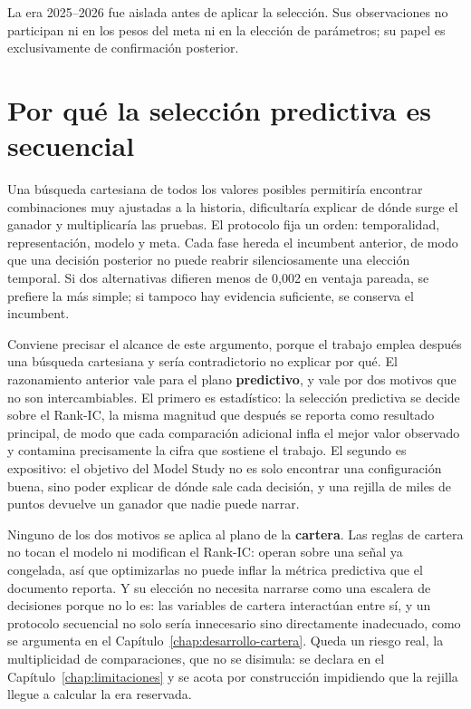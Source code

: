 La era 2025--2026 fue aislada antes de aplicar la selección. Sus observaciones no participan ni en
los pesos del meta ni en la elección de parámetros; su papel es exclusivamente de confirmación
posterior.

\section{Por qué la selección predictiva es secuencial}
\label{sec:seleccion-secuencial}

Una búsqueda cartesiana de todos los valores posibles permitiría encontrar combinaciones muy
ajustadas a la historia, dificultaría explicar de dónde surge el ganador y multiplicaría las
pruebas. El protocolo fija un orden: temporalidad, representación, modelo y meta. Cada fase hereda
el incumbent anterior, de modo que una decisión posterior no puede reabrir silenciosamente una
elección temporal. Si dos alternativas difieren menos de 0,002 en ventaja pareada, se prefiere la
más simple; si tampoco hay evidencia suficiente, se conserva el incumbent.

Conviene precisar el alcance de este argumento, porque el trabajo emplea después una búsqueda
cartesiana y sería contradictorio no explicar por qué. El razonamiento anterior vale para el plano
\textbf{predictivo}, y vale por dos motivos que no son intercambiables. El primero es estadístico:
la selección predictiva se decide sobre el Rank-IC, la misma magnitud que después se reporta como
resultado principal, de modo que cada comparación adicional infla el mejor valor observado y
contamina precisamente la cifra que sostiene el trabajo. El segundo es expositivo: el objetivo del
Model Study no es solo encontrar una configuración buena, sino poder explicar de dónde sale cada
decisión, y una rejilla de miles de puntos devuelve un ganador que nadie puede narrar.

Ninguno de los dos motivos se aplica al plano de la \textbf{cartera}. Las reglas de cartera no
tocan el modelo ni modifican el Rank-IC: operan sobre una señal ya congelada, así que optimizarlas
no puede inflar la métrica predictiva que el documento reporta. Y su elección no necesita narrarse
como una escalera de decisiones porque no lo es: las variables de cartera interactúan entre sí, y un
protocolo secuencial no solo sería innecesario sino directamente inadecuado, como se argumenta en el
Capítulo~\ref{chap:desarrollo-cartera}. Queda un riesgo real, la multiplicidad de comparaciones, que
no se disimula: se declara en el Capítulo~\ref{chap:limitaciones} y se acota por construcción
impidiendo que la rejilla llegue a calcular la era reservada.

